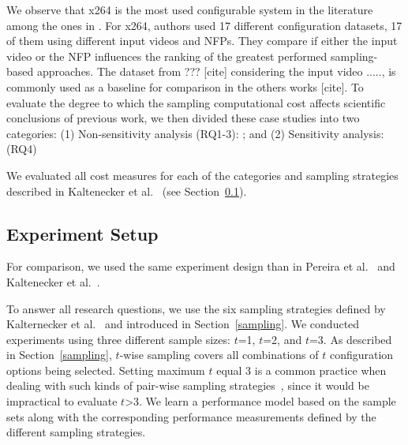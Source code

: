 
We observe that x264 is the most used configurable system in the literature among the ones in . 
For x264, authors used 17 different configuration datasets, 17 of them using different input videos and NFPs.
They compare if either the input video or the NFP influences the ranking of the greatest performed sampling-based approaches. 
The dataset from ??? [cite] considering the input video ....., is commonly used as a baseline for comparison in the others works [cite].
To evaluate the degree to which the sampling computational cost affects scientific conclusions of previous work, we then divided these case studies into two categories: 
(1) Non-sensitivity analysis (RQ1-3): ; and
(2) Sensitivity analysis:  (RQ4)

We evaluated all cost measures for each of the categories and sampling strategies described in Kaltenecker et al.~\cite{kaltenecker2019} (see Section~\ref{sec:experiment}).


\subsection{Experiment Setup} \label{sec:experiment}

For comparison, we used the same experiment design than in Pereira et al.~\cite{pereira2020} and Kaltenecker et al.~\cite{kaltenecker2019}.

To answer all research questions, we use the six sampling strategies defined by Kalternecker et al.~\cite{kaltenecker2019} and introduced in Section~\ref{sampling}.
We conducted experiments using three different sample sizes: $t$=1, $t$=2, and $t$=3.
As described in Section~\ref{sampling}, $t$-wise sampling covers all combinations of $t$ configuration options being selected.
Setting maximum $t$ equal 3 is a common practice when dealing with such kinds of pair-wise sampling strategies~\cite{}, since it would be impractical to evaluate $t$>3. 
We learn a performance model based on the sample sets along with the corresponding performance measurements defined by the different sampling strategies.

